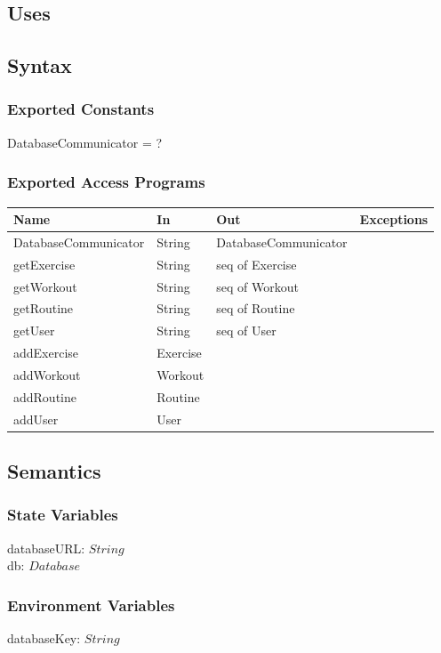 \documentclass[12pt, titlepage]{article}
\begin{document}
\subsection{Uses}

\subsection{Syntax}

\subsubsection{Exported Constants}
DatabaseCommunicator = ?
\subsubsection{Exported Access Programs}

\begin{center}
	\begin{tabular}{p{4cm} p{4cm} p{4cm} p{2cm}}
		\hline
		\textbf{Name} & \textbf{In} & \textbf{Out} & \textbf{Exceptions} \\
		\hline
		DatabaseCommunicator & String & DatabaseCommunicator &  \\
		getExercise & String & seq of Exercise &  \\
		getWorkout & String & seq of Workout &  \\
		getRoutine & String & seq of Routine &  \\
		getUser & String & seq of User &  \\
		addExercise & Exercise &  &  \\
		addWorkout & Workout &  &  \\
		addRoutine & Routine &  &  \\
		addUser & User &  &  \\
		\hline
	\end{tabular}
\end{center}

\subsection{Semantics}

\subsubsection{State Variables}
databaseURL: $String$ \\
db: $Database$
\subsubsection{Environment Variables}
databaseKey: $String$
\end{document}

